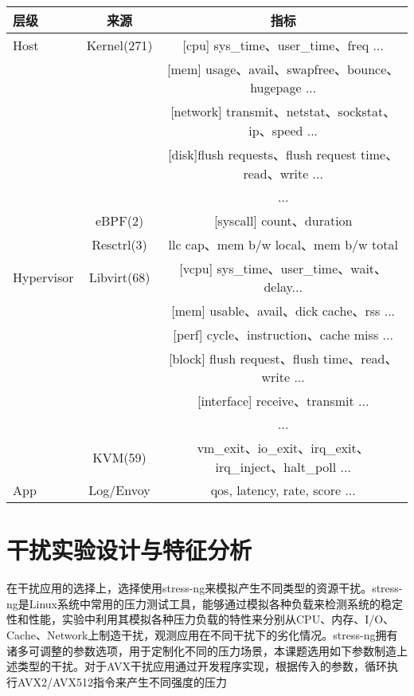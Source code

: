 \begin{table}
    \label{tab:metric_list}
    \footnotesize%
    \setlength{\tabcolsep}{4pt}%
    \renewcommand{\arraystretch}{1.5}%
    \centering
    \begin{tabular}{lcc}
        \hline
        层级 & 来源 & 指标\\
        \hline
        Host & Kernel(271) & [cpu] sys_time、user_time、freq ... \\
        & & [mem] usage、avail、swapfree、bounce、hugepage ...\\
        & & [network] transmit、netstat、sockstat、ip、speed ...\\
        & & [disk]flush requests、flush request time、read、write ...\\
        & & ...\\
        & eBPF(2) & [syscall] count、duration\\
        & Resctrl(3) & llc cap、mem b/w local、mem b/w total\\
        Hypervisor & Libvirt(68) & [vcpu] sys_time、user_time、wait、delay...\\
        & & [mem] usable、avail、dick cache、rss ...\\
        & & [perf] cycle、instruction、cache miss ...\\
        & & [block] flush request、flush time、read、write ...\\
        & & [interface] receive、transmit ...\\
        & & ...\\
        & KVM(59) & vm_exit、io_exit、irq_exit、irq_inject、halt_poll ...\\
        App & Log/Envoy & qos, latency, rate, score ...\\
        \hline
    \end{tabular}
\end{table}

\section{干扰实验设计与特征分析}


在干扰应用的选择上，选择使用stress-ng来模拟产生不同类型的资源干扰。stress-ng是Linux系统中常用的压力测试工具，能够通过模拟各种负载来检测系统的稳定性和性能，实验中利用其模拟各种压力负载的特性来分别从CPU、内存、I/O、Cache、Network上制造干扰，观测应用在不同干扰下的劣化情况。stress-ng拥有诸多可调整的参数选项，用于定制化不同的压力场景，本课题选用如下参数制造上述类型的干扰。对于AVX干扰应用通过开发程序实现，根据传入的参数，循环执行AVX2/AVX512指令来产生不同强度的压力

